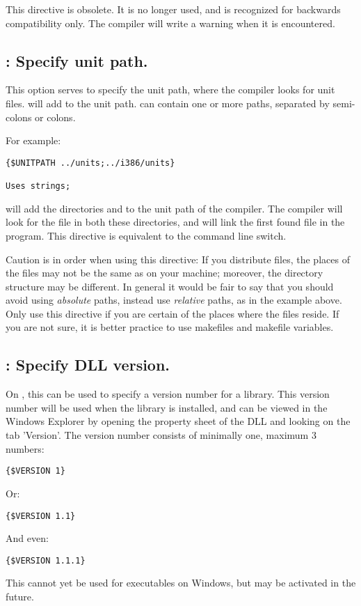 This directive is obsolete. It is no longer used, and is recognized for
backwards compatibility only.
The compiler will write a warning when it is encountered.

\subsection{ : Specify unit path.}

This option serves to specify the unit path, where the compiler looks for
unit files.  will add  to the unit
path.  can contain one or more paths, separated by semi-colons or
colons.

For example:
\begin{verbatim}
{$UNITPATH ../units;../i386/units}

Uses strings;
\end{verbatim}

will add the directories  and  to the unit
path of the compiler. The compiler will look for the file 
in both these directories, and will link the first found file in the
program. This directive is equivalent to the  command line switch.

Caution is in order when using this directive: If you distribute files, the
places of the files may not be the same as on your machine; moreover, the
directory structure may be different. In general it would be fair to say
that you should avoid using {\em absolute} paths, instead use {\em relative}
paths, as in the example above. Only use this directive if you are certain
of the places where the files reside. If you are not sure, it is better
practice to use makefiles and makefile variables.

\subsection{ : Specify DLL version.}
On \windows, this can be used to specify a version number for a library.
This version number will be used when the library is installed, and can be
viewed in the Windows Explorer by opening the property sheet of the DLL and
looking on the tab 'Version'. The version number consists of minimally one,
maximum 3 numbers:
\begin{verbatim}
{$VERSION 1}
\end{verbatim}
Or:
\begin{verbatim}
{$VERSION 1.1}
\end{verbatim}
And even:
\begin{verbatim}
{$VERSION 1.1.1}
\end{verbatim}
This cannot yet be used for executables on Windows, but may be activated in
the future.

